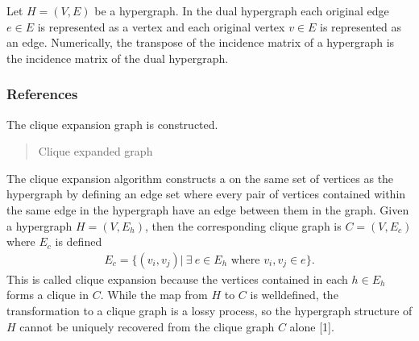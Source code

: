 \documentclass[letterpaper,10pt,english]{sphinxmanual}
\begin{document}
\begin{fulllineitems}
\begin{fulllineitems}
\begin{quote}
\begin{description}
\sphinxAtStartPar
{}

\end{description}\end{quote}

\sphinxAtStartPar
Let \(H=(V,E)\) be a hypergraph. In the dual hypergraph each original edge \(e\in E\)
is represented as a vertex and each original vertex \(v\in E\) is represented as an edge. Numerically, the
transpose of the incidence matrix of a hypergraph is the incidence matrix of the dual hypergraph.
\subsubsection*{References}

\end{fulllineitems}


\begin{fulllineitems}
\label{\detokenize{HAT:HAT.Hypergraph.Hypergraph.cliqueGraph}}
\pysigstartsignatures
{}
\pysigstopsignatures
\sphinxAtStartPar
The clique expansion graph is constructed.
\begin{quote}\begin{description}
\sphinxAtStartPar
Clique expanded graph

\sphinxAtStartPar
{}

\end{description}\end{quote}

\sphinxAtStartPar
The clique expansion algorithm constructs a  on the same set of vertices as the hypergraph by defining an
edge set where every pair of vertices contained within the same edge in the hypergraph have an edge between them
in the graph. Given a hypergraph \(H=(V,E_h)\), then the corresponding clique graph is \(C=(V,E_c)\) where
\(E_c\) is defined
\begin{equation*}
\begin{split}E_c = \{(v_i, v_j) |\ \exists\  e\in E_h \text{ where } v_i, v_j\in e\}.\end{split}
\end{equation*}
\sphinxAtStartPar
This is called clique expansion because the vertices contained in each \(h\in E_h\) forms a clique in \(C\).
While the map from \(H\) to \(C\) is well\sphinxhyphen{}defined, the transformation to a clique graph is a lossy process,
so the hypergraph structure of \(H\) cannot be uniquely recovered from the clique graph \(C\) alone {[}1{]}.

\end{fulllineitems}
\end{fulllineitems}
\end{document}
